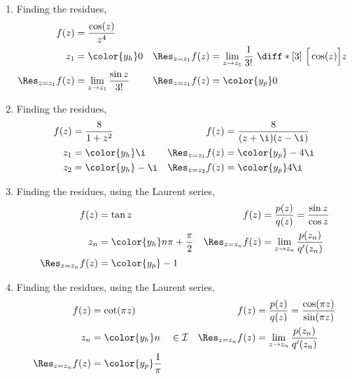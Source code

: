 \begin{enumerate}
    \item Finding the residues,
          \begin{align}
              f(z)                & = \frac{\cos(z)}{z^4}                        \\
              z_1                 & = \color{y_h} 0                            &
              \Res_{z = z_1} f(z) & = \lim_{z \to z_1} \frac{1}{3!}\ \diff*[3]
              {\ \Big[ \cos(z) \Big]}{z}                                         \\
              \Res_{z = z_1} f(z) & = \lim_{z \to z_1} \frac{\sin z}{3!}       &
              \Res_{z = z_1} f(z) & = \color{y_p} 0
          \end{align}

    \item Finding the residues,
          \begin{align}
              f(z)                & = \frac{8}{1 + z^2}          &
              f(z)                & = \frac{8}{(z + \i)(z - \i)}   \\
              z_1                 & = \color{y_h} \i             &
              \Res_{z = z_1} f(z) & = \color{y_p} -4\i             \\
              z_2                 & = \color{y_h} -\i            &
              \Res_{z = z_2} f(z) & = \color{y_p} 4\i
          \end{align}

    \item Finding the residues, using the Laurent series,
          \begin{align}
              f(z)                & = \tan z                                    &
              f(z)                & = \frac{p(z)}{q(z)} = \frac{\sin z}{\cos z}   \\
              z_n                 & = \color{y_h} n\pi + \frac{\pi}{2}          &
              \Res_{z = z_n} f(z) & = \lim_{z \to z_n} \frac{p(z_n)}{q'(z_n)}     \\
              \Res_{z = z_n} f(z) & = \color{y_p} -1
          \end{align}

    \item Finding the residues, using the Laurent series,
          \begin{align}
              f(z)                & = \cot(\pi z)                             &
              f(z)                & = \frac{p(z)}{q(z)} = \frac{\cos(\pi z)}
              {\sin(\pi z)}                                                     \\
              z_n                 & = \color{y_h} n \quad \in \mathcal{I}     &
              \Res_{z = z_n} f(z) & = \lim_{z \to z_n} \frac{p(z_n)}{q'(z_n)}   \\
              \Res_{z = z_n} f(z) & = \color{y_p} \frac{1}{\pi}
          \end{align}


\end{enumerate}
